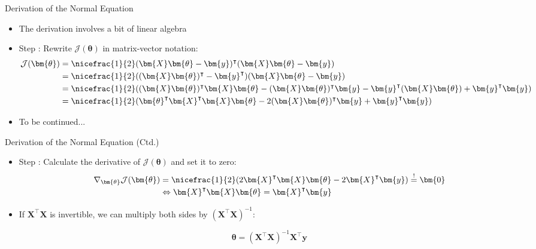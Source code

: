 \begin{frame}{Derivation of the Normal Equation}{}\optional
	\begin{itemize}
		\item The derivation involves a bit of linear algebra
		\item Step : Rewrite $\mathcal{J}(\bm{\theta})$ in matrix-vector notation:
		\begin{align*}
			\mathcal{J}(\bm{\theta})
				&= \nicefrac{1}{2}(\bm{X} \bm{\theta} - \bm{y})^{\intercal} (\bm{X} \bm{\theta} - \bm{y}) \\
				&= \nicefrac{1}{2}((\bm{X} \bm{\theta})^{\intercal} - \bm{y}^{\intercal}) (\bm{X} \bm{\theta} - \bm{y}) \\
				&= \nicefrac{1}{2}((\bm{X} \bm{\theta})^{\intercal} \bm{X} \bm{\theta} - (\bm{X} \bm{\theta})^{\intercal} \bm{y}
					- \bm{y}^{\intercal} (\bm{X} \bm{\theta}) + \bm{y}^{\intercal} \bm{y}) \\
				&= \nicefrac{1}{2}(\bm{\theta}^{\intercal} \bm{X}^{\intercal} \bm{X} \bm{\theta}
					- 2 (\bm{X} \bm{\theta})^{\intercal} \bm{y} + \bm{y}^{\intercal} \bm{y})
		\end{align*}
		\item To be continued...
	\end{itemize}
\end{frame}


\begin{frame}{Derivation of the Normal Equation (Ctd.)}{}\optional
	\begin{itemize}
		\item Step : Calculate the derivative of $\mathcal{J}(\bm{\theta})$ and set it to zero:
		\begin{align*}
			\nabla_{\bm{\theta}}\mathcal{J}(\bm{\theta})
				&= \nicefrac{1}{2}(2 \bm{X}^{\intercal} \bm{X} \bm{\theta} - 2 \bm{X}^{\intercal} \bm{y}) \overset{!}{=} \bm{0} \\	
				&\Leftrightarrow \bm{X}^{\intercal} \bm{X} \bm{\theta} = \bm{X}^{\intercal} \bm{y}
		\end{align*}
		\item If $\bm{X}^{\intercal} \bm{X}$ is invertible, we can multiply both sides by
			$(\bm{X}^{\intercal} \bm{X})^{-1}$:
		\vspace*{3mm}
		\begin{boxBlueNoFrame}
			\begin{equation*}
				\bm{\theta} = (\bm{X}^{\intercal} \bm{X})^{-1} \bm{X}^{\intercal} \bm{y}
			\end{equation*}
		\end{boxBlueNoFrame}
	\end{itemize}
\end{frame}


